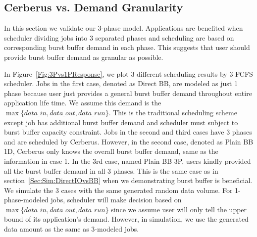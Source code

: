 \subsection{Cerberus vs. Demand Granularity}
In this section we validate our 3-phase model.
Applications are benefited when scheduler dividing jobs into 3 separated phases and 
scheduling are based on corresponding burst buffer demand in each phase.
This suggests that user should provide burst buffer demand as granular as possible.

In Figure~\ref{Fig:3Pvs1PResponse}, we plot 3 different scheduling results by 3 FCFS scheduler.
Jobs in the first case, denoted as Direct BB, are modeled as just 1 phase because user just provides
a general burst buffer demand throughout entire application life time.
We assume this demand is the $\max \{data\_in, data\_out, data\_run\}$.
This is the traditional scheduling scheme except job has additional
burst buffer demand and scheduler must subject to burst buffer capacity constraint.
Jobs in the second and third cases have 3 phases and are scheduled by Cerberus.
However, in the second case, denoted as Plain BB 1D, Cerberus only knows the overall burst buffer demand,
same as the information in case 1.
In the 3rd case, named Plain BB 3P, users kindly provided all the burst buffer demand in all 3 phases.
This is the same case as in section~\ref{Sec:Sim:DirectIOvsBB} when we demonstrating burst buffer is beneficial.
We simulate the 3 cases with the same generated random data volume.
For 1-phase-modeled jobs, scheduler will make decision based on $\max \{data\_in, data\_out, data\_run\}$
since we assume user will only tell the upper bound of its application's demand.
However, in simulation, we use the generated data amount as the same as 3-modeled jobs.

